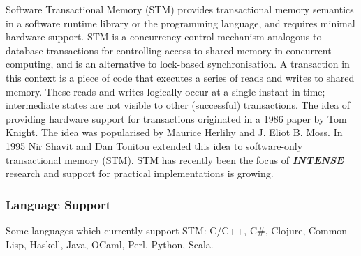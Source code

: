 \documentclass[a4paper,oneside]{report}
\begin{document}
  	Software Transactional Memory (STM) provides transactional memory semantics in a software runtime library or the programming language, and requires minimal hardware support. STM is a concurrency control mechanism analogous to database transactions for controlling access to shared memory in concurrent computing, and is an alternative to lock-based synchronisation. A transaction in this context is a piece of code that executes a series of reads and writes to shared memory. These reads and writes logically occur at a single instant in time; intermediate states are not visible to other (successful) transactions. The idea of providing hardware support for transactions originated in a 1986 paper by Tom Knight. The idea was popularised by Maurice Herlihy and J. Eliot B. Moss. In 1995 Nir Shavit and Dan Touitou extended this idea to software-only transactional memory (STM). STM has recently been the focus of \textbf{\emph{INTENSE}} research and support for practical implementations is growing.
  	
  	\subsubsection{Language Support}
  	Some languages which currently support STM: 
  	C/C++, C#, Clojure, Common Lisp, Haskell, Java, OCaml, Perl, Python, Scala.
\end{document}
